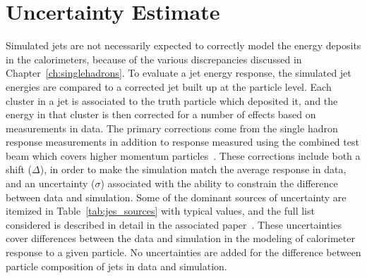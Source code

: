 \section{Uncertainty Estimate}

Simulated jets are not necessarily expected to correctly model the energy deposits in the calorimeters, because of the various discrepancies discussed in Chapter~\ref{ch:singlehadrons}.
To evaluate a jet energy response, the simulated jet energies are compared to a corrected jet built up at the particle level.
Each cluster in a jet is associated to the truth particle which deposited it, and the energy in that cluster is then corrected for a number of effects based on measurements in data. 
The primary corrections come from the single hadron response measurements in addition to response measured using the combined test beam which covers higher momentum particles~\cite{CTB}.
These corrections include both a shift ($\Delta$), in order to make the simulation match the average response in data, and an uncertainty ($\sigma$) associated with the ability to constrain the difference between data and simulation.
Some of the dominant sources of uncertainty are itemized in Table~\ref{tab:jes_sources} with typical values, and the full list considered is described in detail in the associated paper~\cite{PERF-2015-05}. 
These uncertainties cover differences between the data and simulation in the modeling of calorimeter response to a given particle.
No uncertainties are added for the difference between particle composition of jets in data and simulation.


